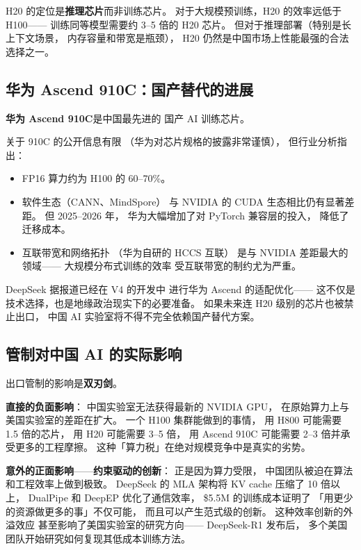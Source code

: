 H20 的定位是\textbf{推理芯片}而非训练芯片。
对于大规模预训练，H20 的效率远低于 H100——
训练同等模型需要约 3--5 倍的 H20 芯片。
但对于推理部署（特别是长上下文场景，
内存容量和带宽是瓶颈），
H20 仍然是中国市场上性能最强的合法选择之一。

\subsection{华为 Ascend 910C：国产替代的进展}

\textbf{华为 Ascend 910C}是中国最先进的
国产 AI 训练芯片。

关于 910C 的公开信息有限
（华为对芯片规格的披露非常谨慎），
但行业分析指出：
\begin{itemize}[noitemsep]
  \item FP16 算力约为 H100 的 60--70\%。
  \item 软件生态（CANN、MindSpore）
        与 NVIDIA 的 CUDA 生态相比仍有显著差距。
        但 2025--2026 年，
        华为大幅增加了对 PyTorch 兼容层的投入，
        降低了迁移成本。
  \item 互联带宽和网络拓扑
        （华为自研的 HCCS 互联）
        是与 NVIDIA 差距最大的领域——
        大规模分布式训练的效率
        受互联带宽的制约尤为严重。
\end{itemize}

DeepSeek 据报道已经在 V4 的开发中
进行华为 Ascend 的适配优化——
这不仅是技术选择，也是地缘政治现实下的必要准备。
如果未来连 H20 级别的芯片也被禁止出口，
中国 AI 实验室将不得不完全依赖国产替代方案。

\subsection{管制对中国 AI 的实际影响}

出口管制的影响是\textbf{双刃剑}。

\textbf{直接的负面影响}：
中国实验室无法获得最新的 NVIDIA GPU，
在原始算力上与美国实验室的差距在扩大。
一个 H100 集群能做到的事情，
用 H800 可能需要 1.5 倍的芯片，
用 H20 可能需要 3--5 倍，
用 Ascend 910C 可能需要 2--3 倍并承受更多的工程摩擦。
这种「算力税」在绝对规模竞争中是真实的劣势。

\textbf{意外的正面影响}——\textbf{约束驱动的创新}：
正是因为算力受限，
中国团队被迫在算法和工程效率上做到极致。
DeepSeek 的 MLA 架构将 KV cache 压缩了 10 倍以上，
DualPipe 和 DeepEP 优化了通信效率，
\$5.5M 的训练成本证明了
「用更少的资源做更多的事」不仅可能，
而且可以产生范式级的创新。
这种效率创新的外溢效应
甚至影响了美国实验室的研究方向——
DeepSeek-R1 发布后，
多个美国团队开始研究如何复现其低成本训练方法。


